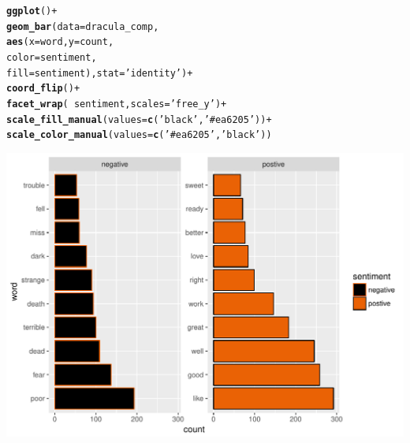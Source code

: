 \documentclass{beamer}\usepackage[]{graphicx}\usepackage[]{color}
\makeatletter
\def\maxwidth{ %
  \ifdim\Gin@nat@width>\linewidth
    \linewidth
  \else
    \Gin@nat@width
  \fi
}
\newcommand{\hlstr}[1]{\textcolor[rgb]{0.192,0.494,0.8}{#1}}%
\newcommand{\hlopt}[1]{\textcolor[rgb]{0,0,0}{#1}}%
\newcommand{\hlstd}[1]{\textcolor[rgb]{0.345,0.345,0.345}{#1}}%
\newcommand{\hlkwc}[1]{\textcolor[rgb]{0.333,0.667,0.333}{#1}}%
\newcommand{\hlkwd}[1]{\textcolor[rgb]{0.737,0.353,0.396}{\textbf{#1}}}%
\newenvironment{kframe}{%
 \def\at@end@of@kframe{}%
 \ifinner\ifhmode%
  \def\at@end@of@kframe{\end{minipage}}%
  \begin{minipage}{\columnwidth}%
 \fi\fi%
 \def\FrameCommand##1{\hskip\@totalleftmargin \hskip-\fboxsep
 \colorbox{shadecolor}{##1}\hskip-\fboxsep
     \hskip-\linewidth \hskip-\@totalleftmargin \hskip\columnwidth}%
 \MakeFramed {\advance\hsize-\width
   \@totalleftmargin\z@ \linewidth\hsize
   \@setminipage}}%
 {\par\unskip\endMakeFramed%
 \at@end@of@kframe}
\newenvironment{knitrout}{}{} %
\makeatother
\begin{document}
\begin{frame}
\begin{knitrout}
\color{fgcolor}\begin{kframe}
\begin{alltt}
\hlkwd{ggplot}\hlstd{()}\hlopt{+}
  \hlkwd{geom_bar}\hlstd{(}\hlkwc{data} \hlstd{= dracula_comp,}
           \hlkwd{aes}\hlstd{(}\hlkwc{x} \hlstd{= word,} \hlkwc{y} \hlstd{= count,}
               \hlkwc{color} \hlstd{= sentiment,}
               \hlkwc{fill} \hlstd{= sentiment),} \hlkwc{stat} \hlstd{=} \hlstr{'identity'}\hlstd{)}\hlopt{+}
  \hlkwd{coord_flip}\hlstd{()}\hlopt{+}
  \hlkwd{facet_wrap}\hlstd{(}\hlopt{~}\hlstd{sentiment,} \hlkwc{scales} \hlstd{=} \hlstr{'free_y'}\hlstd{)}\hlopt{+}
  \hlkwd{scale_fill_manual}\hlstd{(}\hlkwc{values} \hlstd{=} \hlkwd{c}\hlstd{(}\hlstr{'black'}\hlstd{,} \hlstr{'#ea6205'}\hlstd{))}\hlopt{+}
  \hlkwd{scale_color_manual}\hlstd{(}\hlkwc{values} \hlstd{=} \hlkwd{c}\hlstd{(}\hlstr{'#ea6205'}\hlstd{,} \hlstr{'black'}\hlstd{))}
\end{alltt}
\end{kframe}
\includegraphics[width=\maxwidth]{figure/unnamed-chunk-19-1} 

\end{knitrout}

\end{frame}
\end{document}
